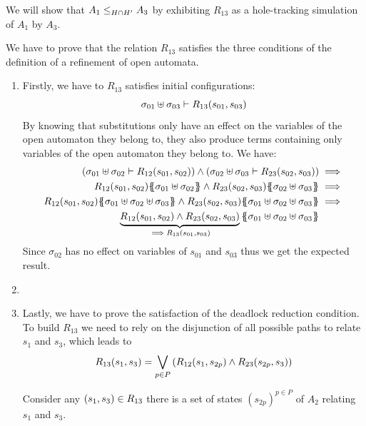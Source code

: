 \documentclass[runningheads]{llncs}
\begin{document}
We will show that $\wrel{A_1}{A_3}{H\cap H'}$ by exhibiting  $R_{13}$ as a hole-tracking simulation of $A_1$ by  $A_3$.

We have to prove that the relation $R_{13}$ satisfies the three conditions of the definition of a refinement of open automata.
\begin{enumerate}
\item Firstly, we have to $R_{13}$ satisfies initial configurations:
\[\sigma_{01} \uplus \sigma_{03} \vdash R_{13} \mpar{s_{01}, s_{03}}\]
By knowing that substitutions only have an effect on the variables of the open automaton they belong to, they also produce terms containing only variables of the open automaton they belong to. We have:
\begin{align*}
\mpar{\sigma_{01} \uplus \sigma_{02} \vdash R_{12}\mpar{s_{01}, s_{02}}} \wedge \mpar
{\sigma_{02} \uplus \sigma_{03} \vdash R_{23}\mpar{s_{02}, s_{03}}}&\implies\\
R_{12}\mpar{s_{01},s_{02}}\psubst{\sigma_{01} \uplus \sigma_{02}} \wedge R_{23}\mpar{s_{02}, s_{03}}\psubst{\sigma_{02} \uplus \sigma_{03}}&\implies\\
R_{12}\mpar{s_{01},s_{02}}\psubst{\sigma_{01} \uplus \sigma_{02} \uplus \sigma_{03}} \wedge R_{23}\mpar{s_{02}, s_{03}}\psubst{\sigma_{01} \uplus \sigma_{02} \uplus \sigma_{03}}&\implies\\ 
\underbrace{R_{12}\mpar{s_{01},s_{02}}\wedge R_{23}\mpar{s_{02}, s_{03}}}_{\implies R_{13} \mpar{s_{01}, s_{03}}}\psubst{\sigma_{01} \uplus \sigma_{02} \uplus \sigma_{03}} %
 \end{align*}
Since $\sigma_{02}$ has no effect on variables of $s_{01}$ and $s_{03}$ thus we get the expected result.

\item {}

\item Lastly, we have to prove the satisfaction of the deadlock reduction condition. 
 To build $R_{13}$ we need to rely on the disjunction of all possible paths to relate $s_1$ and $s_3$, which leads to \[{\displaystyle R_{13}(s_1,s_3)=\bigvee_{{p\in P}}\mpar{R_{12}\mpar{s_1,s_{2p}} \wedge R_{23}\mpar{s_{2p},s_3}}}\]

Consider any $\mpar{s_{1}, s_{3}} \in R_{13}$  there is a set of states $(s_{2p})^{p\in P}$ of $A_2$ relating  $s_{1}$ and $s_{3}$.



\end{enumerate}
\end{document}
